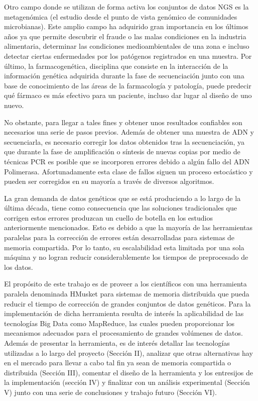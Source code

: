 \documentclass[conference]{IEEEtran}
\begin{document}
Otro campo donde se utilizan de forma activa los conjuntos de datos NGS es la metagenómica (el estudio desde el punto de vista genómico de comunidades microbianas). Este amplio campo ha adquirido gran importancia en los últimos años ya que permite descubrir el fraude o las malas condiciones en la industria alimentaria, determinar las condiciones medioambientales de una zona e incluso detectar ciertas enfermedades por los patógenos registrados en una muestra. Por último, la farmacogenética, disciplina que consiste en la interacción de la información genética adquirida durante la fase de secuenciación junto con una base de conocimiento de las áreas de la farmacología y patología, puede predecir qué fármaco es más efectivo para un paciente, incluso dar lugar al diseño de uno nuevo.

No obstante, para llegar a tales fines y obtener unos resultados confiables son necesarios una serie de pasos previos. Además de obtener una muestra de ADN y secuenciarla, es necesario corregir los datos obtenidos tras la secuenciación, ya que durante la fase de amplificación o síntesis de nuevas copias por medio de técnicas PCR\cite{pcr} es posible que se incorporen errores debido a algún fallo del ADN Polimerasa\cite{adn_polimerasa}. Afortunadamente esta clase de fallos siguen un proceso estocástico y pueden ser corregidos en su mayoría a través de diversos algoritmos.

La gran demanda de datos genéticos que se está produciendo a lo largo de la última década, tiene como consecuencia que las soluciones tradicionales que corrigen estos errores produzcan un cuello de botella en los estudios anteriormente mencionados. Esto es debido a que la mayoría de las herramientas paralelas para la corrección de errores están desarrolladas para sistemas de memoria compartida. Por lo tanto, su escalabilidad esta limitada por una sola máquina y no logran reducir considerablemente los tiempos de preprocesado de los datos.

El propósito de este trabajo es de proveer a los científicos con una herramienta paralela denominada HMusket para sistemas de memoria distribuida que pueda reducir el tiempo de corrección de grandes conjuntos de datos genéticos. Para la implementación de dicha herramienta resulta de interés la aplicabilidad de las tecnologías Big Data como MapReduce, las cuales pueden proporcionar los mecanismos adecuados para el procesamiento de grandes volúmenes de datos. Además de presentar la herramienta, es de interés detallar las tecnologías utilizadas a lo largo del proyecto (Sección II), analizar que otras alternativas hay en el mercado para llevar a cabo tal fin ya sean de memoria compartida o distribuida (Sección III), comentar el diseño de la herramienta y los entresijos de la implementación (sección IV) y finalizar con un análisis experimental (Sección V)  junto con una serie de conclusiones y trabajo futuro (Sección VI).
\end{document}
